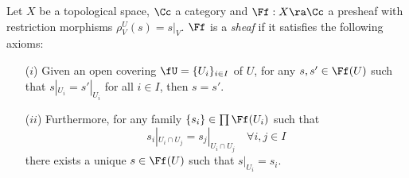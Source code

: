 \begin{defin*}
  Let $X$ be a topological space, $\Cc$ a category and $\Ff:X\ra\Cc$ a presheaf with restriction
  morphisms $\rho^U_V(s)=s|_V$. $\Ff$ is a \emph{sheaf} if it satisfies the following axioms:
  \begin{enumerate}
  \item[($i$)] Given an open covering $\fU=\{U_i\}_{i\in I}$ of $U$, for any $s,s'\in\Ff(U)$
    such that $s|_{U_i}=s'|_{U_i}$ for all $i\in I$, then $s=s'$.

  \item[($ii$)] Furthermore, for any family $\{s_i\}\in\prod\Ff(U_i)$ such that
    \[
      s_i|_{U_i\cap U_j}=s_j|_{U_i\cap U_j} \quad\forall i,j\in I
    \]
    there exists a unique $s\in\Ff(U)$ such that $s|_{U_i}=s_i$.
  \end{enumerate}
\end{defin*}
